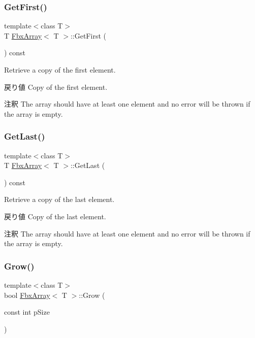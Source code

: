 \subsubsection{\texorpdfstring{Get\+First()}{GetFirst()}}
{\footnotesize\ttfamily template$<$class T$>$ \\
T \hyperlink{class_fbx_array}{Fbx\+Array}$<$ T $>$\+::Get\+First (\begin{DoxyParamCaption}{ }\end{DoxyParamCaption}) const}

Retrieve a copy of the first element. \begin{DoxyReturn}{戻り値}
Copy of the first element. 
\end{DoxyReturn}
\begin{DoxyRemark}{注釈}
The array should have at least one element and no error will be thrown if the array is empty. 
\end{DoxyRemark}
\mbox{\label{class_fbx_array_a25a185391ce395e3d409ceef08200f14}} 
\subsubsection{\texorpdfstring{Get\+Last()}{GetLast()}}
{\footnotesize\ttfamily template$<$class T$>$ \\
T \hyperlink{class_fbx_array}{Fbx\+Array}$<$ T $>$\+::Get\+Last (\begin{DoxyParamCaption}{ }\end{DoxyParamCaption}) const}

Retrieve a copy of the last element. \begin{DoxyReturn}{戻り値}
Copy of the last element. 
\end{DoxyReturn}
\begin{DoxyRemark}{注釈}
The array should have at least one element and no error will be thrown if the array is empty. 
\end{DoxyRemark}
\mbox{\label{class_fbx_array_a5d4cc67b153105946b82b178b7240a5a}} 
\subsubsection{\texorpdfstring{Grow()}{Grow()}}
{\footnotesize\ttfamily template$<$class T$>$ \\
bool \hyperlink{class_fbx_array}{Fbx\+Array}$<$ T $>$\+::Grow (\begin{DoxyParamCaption}\item[{const int}]{p\+Size }\end{DoxyParamCaption})}

